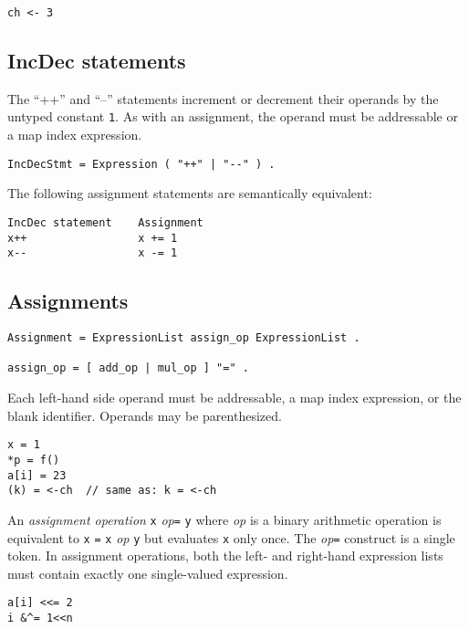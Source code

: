 \begin{Verbatim}[frame=single]
ch <- 3
\end{Verbatim}

\subsection*{IncDec statements}

The ``++'' and ``--'' statements increment or decrement their operands
by the untyped constant \texttt{1}. As with an
assignment, the operand must be
addressable or a map index expression.

\begin{Verbatim}[frame=single]
IncDecStmt = Expression ( "++" | "--" ) .
\end{Verbatim}

The following assignment statements are
semantically equivalent:

\begin{Verbatim}[frame=single]
IncDec statement    Assignment
x++                 x += 1
x--                 x -= 1
\end{Verbatim}

\subsection*{Assignments}

\begin{Verbatim}[frame=single]
Assignment = ExpressionList assign_op ExpressionList .

assign_op = [ add_op | mul_op ] "=" .
\end{Verbatim}

Each left-hand side operand must be
addressable, a map index expression, or
the blank identifier. Operands may be
parenthesized.

\begin{Verbatim}[frame=single]
x = 1
*p = f()
a[i] = 23
(k) = <-ch  // same as: k = <-ch
\end{Verbatim}

An \emph{assignment operation} \texttt{x} \emph{op}\texttt{=} \texttt{y}
where \emph{op} is a binary arithmetic operation is equivalent to
\texttt{x} \texttt{=} \texttt{x} \emph{op} \texttt{y} but evaluates
\texttt{x} only once. The \emph{op}\texttt{=} construct is a single
token. In assignment operations, both the left- and right-hand
expression lists must contain exactly one single-valued expression.

\begin{Verbatim}[frame=single]
a[i] <<= 2
i &^= 1<<n
\end{Verbatim}

